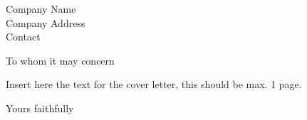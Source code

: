 \documentclass[
parskip=half,
fontsize=11pt, %
twoside=off, %
version=last,
foldmarks=false,
fromalign=left, %
fromrule=true,
frommobilephone,
fromemail,
fromlogo, %
subject=titled,
backaddress=false,
]    
{scrlttr2}
\newcommand{\address}{
Company Name    \\
Company Address \\
Contact         \\
}
\begin{document}
\begin{letter}{\address}
	\opening{To whom it may concern}

	Insert here the text for the cover letter, this should be max. 1 page.
	\closing{Yours faithfully}


\end{letter}
\end{document}
